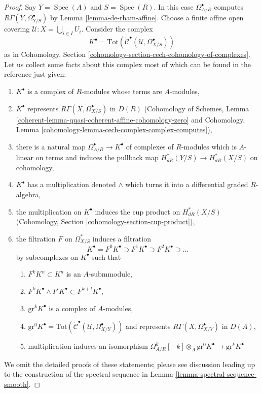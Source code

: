 \documentclass[10pt,a4paper]{amsart}
\theoremstyle{plain}
\theoremstyle{definition}
\theoremstyle{remark}
\numberwithin{equation}{subsection}
\def\Spec{\mathop{\mathrm{Spec}}}
\begin{document}
\begin{proof}
Say $Y = \Spec(A)$ and $S = \Spec(R)$.
In this case $\Omega^\bullet_{A/R}$ computes
$R\Gamma(Y, \Omega^\bullet_{Y/S})$ by Lemma \ref{lemma-de-rham-affine}.
Choose a finite affine open covering $\mathcal{U} : X = \bigcup_{i \in I} U_i$.
Consider the complex
$$
K^\bullet =
\text{Tot}(\check{\mathcal{C}}^\bullet(\mathcal{U}, \Omega_{X/S}^\bullet))
$$
as in
Cohomology, Section \ref{cohomology-section-cech-cohomology-of-complexes}.
Let us collect some facts about this complex most of which
can be found in the reference just given:
\begin{enumerate}
\item $K^\bullet$ is a complex of $R$-modules whose terms are
$A$-modules,
\item $K^\bullet$ represents $R\Gamma(X, \Omega^\bullet_{X/S})$ in $D(R)$
(Cohomology of Schemes, Lemma
\ref{coherent-lemma-quasi-coherent-affine-cohomology-zero} and
Cohomology, Lemma \ref{cohomology-lemma-cech-complex-complex-computes}),
\item there is a natural map $\Omega^\bullet_{A/R} \to K^\bullet$
of complexes of $R$-modules which is $A$-linear on terms and
induces the pullback map $H^*_{dR}(Y/S) \to H^*_{dR}(X/S)$
on cohomology,
\item $K^\bullet$ has a multiplication denoted $\wedge$
which turns it into a differential graded $R$-algebra,
\item the multiplication on $K^\bullet$
induces the cup product on $H^*_{dR}(X/S)$
(Cohomology, Section \ref{cohomology-section-cup-product}),
\item the filtration $F$ on $\Omega^*_{X/S}$ induces a filtration
$$
K^\bullet =
F^0K^\bullet \supset F^1K^\bullet \supset F^2K^\bullet \supset \ldots
$$
by subcomplexes on $K^\bullet$ such that
\begin{enumerate}
\item $F^kK^n \subset K^n$ is an $A$-submmodule,
\item $F^kK^\bullet \wedge F^lK^\bullet \subset F^{k + l}K^\bullet$,
\item $\text{gr}^kK^\bullet$ is a complex of $A$-modules,
\item $\text{gr}^0K^\bullet =
\text{Tot}(\check{\mathcal{C}}^\bullet(\mathcal{U}, \Omega_{X/Y}^\bullet))$
and represents $R\Gamma(X, \Omega^\bullet_{X/Y})$ in $D(A)$,
\item multiplication induces an isomorphism
$\Omega^k_{A/R}[-k] \otimes_A \text{gr}^0K^\bullet \to \text{gr}^kK^\bullet$
\end{enumerate}
\end{enumerate}
We omit the detailed proofs of these statements; please see discussion
leading up to the construction of the spectral sequence in
Lemma \ref{lemma-spectral-sequence-smooth}.


\end{proof}
\end{document}
